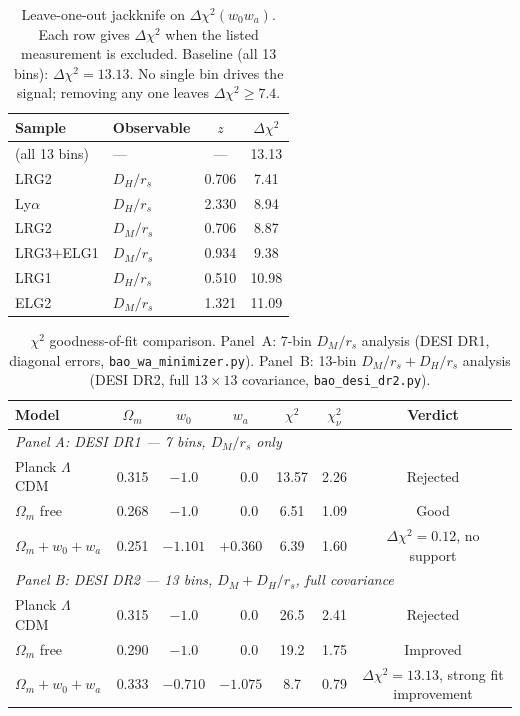 \documentclass[12pt,a4paper]{article}
\begin{document}
\begin{table}[h]
\centering
\caption{Leave-one-out jackknife on $\Delta\chi^2(w_0w_a)$. Each row gives
$\Delta\chi^2$ when the listed measurement is excluded. Baseline (all 13
bins): $\Delta\chi^2 = 13.13$. No single bin drives the signal; removing any
one leaves $\Delta\chi^2 \geq 7.4$.}
\label{tab:jackknife}
\begin{tabular}{llcc}
\toprule
Sample & Observable & $z$ & $\Delta\chi^2$ \\
\midrule
(all 13 bins)   & ---      & ---   & 13.13 \\
LRG2            & $D_H/r_s$& 0.706 & \phantom{0}7.41 \\
Ly$\alpha$      & $D_H/r_s$& 2.330 & \phantom{0}8.94 \\
LRG2            & $D_M/r_s$& 0.706 & \phantom{0}8.87 \\
LRG3+ELG1      & $D_M/r_s$& 0.934 & \phantom{0}9.38 \\
LRG1            & $D_H/r_s$& 0.510 & 10.98 \\
ELG2            & $D_M/r_s$& 1.321 & 11.09 \\
\bottomrule
\end{tabular}
\end{table}

\begin{table}[h]
\centering
\caption{$\chi^2$ goodness-of-fit comparison. Panel~A: 7-bin $D_M/r_s$
analysis (DESI DR1, diagonal errors, \texttt{bao\_wa\_minimizer.py}). Panel~B:
13-bin $D_M/r_s + D_H/r_s$ analysis (DESI DR2, full $13\times13$ covariance,
\texttt{bao\_desi\_dr2.py}).}
\label{tab:chi2}
\begin{tabular}{lcccccc}
\toprule
Model & $\Omega_m$ & $w_0$ & $w_a$ & $\chi^2$ & $\chi^2_\nu$ &
Verdict \\
\midrule
\multicolumn{7}{l}{\textit{Panel A: DESI DR1 --- 7 bins, $D_M/r_s$ only}} \\
Planck $\Lambda$CDM        & 0.315 & $-1.0$ & $\phantom{+}0.0$ & 13.57 & 2.26 & Rejected \\
$\Omega_m$ free            & 0.268 & $-1.0$ & $\phantom{+}0.0$ & \phantom{0}6.51 & 1.09 & Good \\
$\Omega_m + w_0 + w_a$    & 0.251 & $-1.101$ & $+0.360$ & \phantom{0}6.39 & 1.60 & $\Delta\chi^2=0.12$, no support \\
\midrule
\multicolumn{7}{l}{\textit{Panel B: DESI DR2 --- 13 bins, $D_M + D_H/r_s$, full covariance}} \\
Planck $\Lambda$CDM        & 0.315 & $-1.0$ & $\phantom{+}0.0$   & 26.5 & 2.41 & Rejected \\
$\Omega_m$ free            & 0.290 & $-1.0$ & $\phantom{+}0.0$   & 19.2 & 1.75 & Improved \\
$\Omega_m + w_0 + w_a$    & 0.333 & $-0.710$ & $-1.075$ & \phantom{0}8.7 & 0.79 & $\Delta\chi^2=13.13$, strong fit improvement \\
\bottomrule
\end{tabular}
\end{table}
\end{document}

